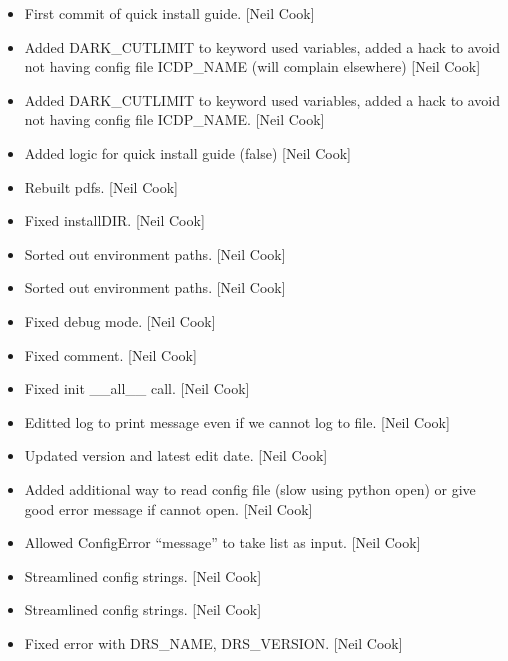 \documentclass[a4paper,10pt,english]{report}
\begin{document}
\begin{itemize}
\item {} 
First commit of quick install guide. {[}Neil Cook{]}

\item {} 
Added DARK\_CUTLIMIT to keyword used variables, added a hack to avoid
not having config file ICDP\_NAME (will complain elsewhere) {[}Neil Cook{]}

\item {} 
Added DARK\_CUTLIMIT to keyword used variables, added a hack to avoid
not having config file ICDP\_NAME. {[}Neil Cook{]}

\item {} 
Added logic for quick install guide (false) {[}Neil Cook{]}

\item {} 
Rebuilt pdfs. {[}Neil Cook{]}

\item {} 
Fixed installDIR. {[}Neil Cook{]}

\item {} 
Sorted out environment paths. {[}Neil Cook{]}

\item {} 
Sorted out environment paths. {[}Neil Cook{]}

\item {} 
Fixed debug mode. {[}Neil Cook{]}

\item {} 
Fixed comment. {[}Neil Cook{]}

\item {} 
Fixed init \_\_all\_\_ call. {[}Neil Cook{]}

\item {} 
Editted log to print message even if we cannot log to file. {[}Neil
Cook{]}

\item {} 
Updated version and latest edit date. {[}Neil Cook{]}

\item {} 
Added additional way to read config file (slow using python open) or
give good error message if cannot open. {[}Neil Cook{]}

\item {} 
Allowed ConfigError “message” to take list as input. {[}Neil Cook{]}

\item {} 
Streamlined config strings. {[}Neil Cook{]}

\item {} 
Streamlined config strings. {[}Neil Cook{]}

\item {} 
Fixed error with DRS\_NAME, DRS\_VERSION. {[}Neil Cook{]}

\end{itemize}
\end{document}
